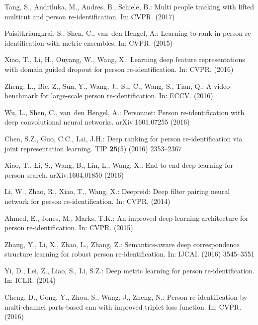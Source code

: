\documentclass{llncs}
\begin{document}
\begin{thebibliography}{10}

Tang, S., Andriluka, M., Andres, B., Schiele, B.:
\newblock Multi people tracking with lifted multicut and person
  re-identification.
\newblock In: CVPR. (2017)

Paisitkriangkrai, S., Shen, C., van~den Hengel, A.:
\newblock Learning to rank in person re-identification with metric ensembles.
\newblock In: CVPR. (2015)

Xiao, T., Li, H., Ouyang, W., Wang, X.:
\newblock Learning deep feature representations with domain guided dropout for
  person re-identification.
\newblock In: CVPR. (2016)

Zheng, L., Bie, Z., Sun, Y., Wang, J., Su, C., Wang, S., Tian, Q.:
 {A} video benchmark for large-scale person re-identification.
\newblock In: ECCV. (2016)

Wu, L., Shen, C., van~den Hengel, A.:
\newblock Personnet: Person re-identification with deep convolutional neural
  networks.
\newblock arXiv:1601.07255 (2016)

Chen, S.Z., Guo, C.C., Lai, J.H.:
\newblock Deep ranking for person re-identification via joint representation
  learning.
 TIP \textbf{25}(5) (2016)  2353--2367

Xiao, T., Li, S., Wang, B., Lin, L., Wang, X.:
\newblock End-to-end deep learning for person search.
\newblock arXiv:1604.01850 (2016)

Li, W., Zhao, R., Xiao, T., Wang, X.:
\newblock Deepreid: Deep filter pairing neural network for person
  re-identification.
\newblock In: CVPR. (2014)

Ahmed, E., Jones, M., Marks, T.K.:
\newblock An improved deep learning architecture for person re-identification.
\newblock In: CVPR. (2015)

Zhang, Y., Li, X., Zhao, L., Zhang, Z.:
\newblock Semantics-aware deep correspondence structure learning for robust
  person re-identification.
\newblock In: IJCAI. (2016)  3545--3551

Yi, D., Lei, Z., Liao, S., Li, S.Z.:
\newblock Deep metric learning for person re-identification.
\newblock In: ICLR. (2014)

Cheng, D., Gong, Y., Zhou, S., Wang, J., Zheng, N.:
\newblock Person re-identification by multi-channel parts-based cnn with
  improved triplet loss function.
\newblock In: CVPR. (2016)


\end{thebibliography}
\end{document}
